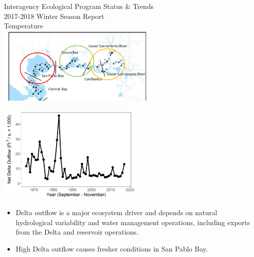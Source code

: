 \documentclass[]{article}\usepackage[]{graphicx}\usepackage[]{color}
\begin{document}
\newpage


\begin{Row}
  \begin{Cell}{7}
    \vspace{0.2cm}
    \begin{center}
      \doublespacing
      {\Large Interagency Ecological Program Status \& Trends } \\
      \vspace{0.2cm}
      {\Large 2017-2018 Winter Season Report} \\
      \vspace{0.5cm}
      {\Huge Temperature} \\
      \vspace{0.75cm}
      \includegraphics[width=8cm,align=m]{figures/region_map.png}
    \end{center}
  \end{Cell}
  \begin{Cell}{6}
    \vspace{0.2cm}
    \begin{center}
      \includegraphics[width=7cm,trim=0 0 0 0,clip,align=m]{figures/outflow_tmp.png}
      \begin{itemize}[leftmargin=*]
        \item Delta outflow is a major ecosystem driver and depends on natural 
        hydrological variability and water management operations, including exports 
        from the Delta and reservoir operations. 
        \item High Delta outflow causes fresher conditions in San Pablo Bay.      
      \end{itemize}
    \end{center}
  \end{Cell}
\end{Row}
\end{document}
